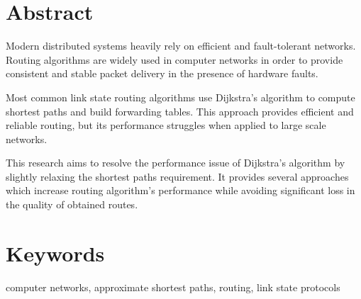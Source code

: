 \section*{Abstract}
Modern distributed systems heavily rely on efficient and fault-tolerant networks. Routing algorithms are widely used in computer networks in order to provide consistent and stable packet delivery in the presence of hardware faults.

Most common link state routing algorithms use Dijkstra's algorithm to compute shortest paths and build forwarding tables. This approach provides efficient and reliable routing, but its performance struggles when applied to large scale networks.

This research aims to resolve the performance issue of Dijkstra's algorithm by slightly relaxing the shortest paths requirement. It provides several approaches which increase routing algorithm's performance while avoiding significant loss in the quality of obtained routes.

\section*{Keywords}

computer networks, approximate shortest paths, routing, link state protocols
